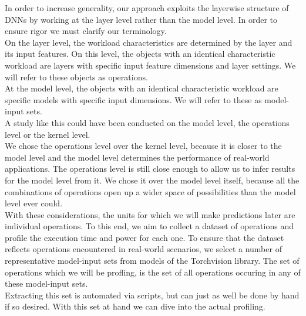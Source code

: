 In order to increase generality, our approach exploits the layerwise structure of DNNs by working at the layer level rather than the model level. In order to ensure rigor we must clarify our terminology. \\
On the layer level, the workload characteristics are determined by the layer and its input features. On this level, the objects with an identical characteristic workload are layers with specific input feature dimensions and layer settings. We will refer to these objects as operations. \\
At the model level, the objects with an identical characteristic workload are specific models with specific input dimensions. We will refer to these as model-input sets.\\ 
A study like this could have been conducted on the model level, the operations level or the kernel level.  \\
We chose the operations level over the kernel level, because it is  closer to the model level and the model level determines the performance of real-world applications. The operations level is still close enough to allow us to infer results for the model level from it. We chose it over the model level itself, because all the combinations of operations open up a wider space of possibilities than the model level ever could. \\ 
With these considerations, the units for which we will make predictions later are individual operations. To this end, we aim to collect a dataset of operations and profile the execution time and power for each one. To ensure that the dataset reflects operations encountered in real-world scenarios, we select a number of representative model-input sets from models of the Torchvision library. The set of operations which we will be profling, is the set of all operations occuring in any of these model-input sets. \\
Extracting this set is automated via scripts, but can just as well be done by hand if so desired. With this set at hand we can dive into the actual profiling.




